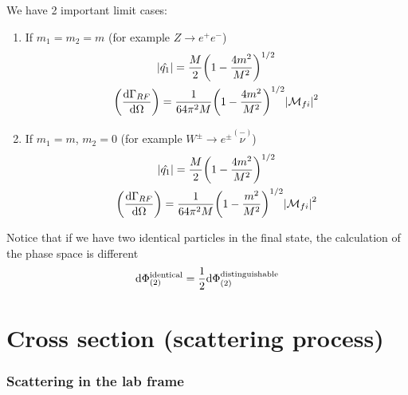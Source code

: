 \documentclass[TheoreticalPhy_ModB.tex]{subfiles}
\begin{document}
\begin{example}[1 $\to$ 2 decay]
We have 2 important limit cases:
\begin{enumerate}[label=(\alph*)]
\item If $m_1 = m_2 = m$ (for example $Z \to e^+ e^-$)
	\begin{gather}
	\abs{\hat{q_1}} = \frac{M}{2} \biggl( 1 - \frac{4 m^2}{M^2} \biggr)^{1/2} \notag \\
	\biggl( \frac{\textup{d} \Gamma_{RF}}{\textup{d} \Omega} \biggr) = \frac{1}{64 \pi^2 M} \biggl( 1 - \frac{4 m^2}{M^2} \biggl)^{1/2} \abs{\mathcal{M}_{fi}}^2 \notag
	\end{gather}
\item If $m_1 = m$, $m_2 = 0$ (for example $W^{\pm} \to e^{\pm} \stackrel{(-)}{\nu}$)
	\begin{gather}
	\abs{\hat{q_1}} = \frac{M}{2} \biggl( 1 - \frac{4 m^2}{M^2} \biggr)^{1/2} \notag \\
	\biggl( \frac{\textup{d} \Gamma_{RF}}{\textup{d} \Omega} \biggr) = \frac{1}{64 \pi^2 M} \biggl( 1 - \frac{m^2}{M^2} \biggr)^{1/2} \abs{\mathcal{M}_{fi}}^2 \notag
	\end{gather}
\end{enumerate}
Notice that if we have two identical particles in the final state, the calculation of the phase space is different
\[
\textup{d} \Phi_{(2)}^{\textup{identical}} = \frac{1}{2} \textup{d} \Phi_{(2)}^{\textup{distinguishable}}
\]
\end{example}

\section{Cross section (scattering process)}

\begin{center}

\end{center}

\subsubsection{Scattering in the lab frame}

\begin{center}

\end{center}
\end{document}
